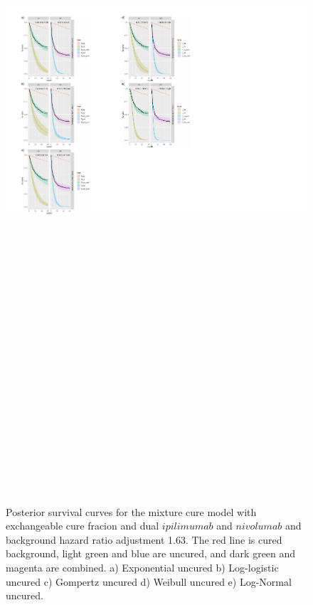 \documentclass[
]{article}
\begin{document}
\begin{figure}

{\centering \includegraphics[width=25cm,height=40cm]{Check_mate_analysis_files/figure-latex/unnamed-chunk-14-1} 

}

\caption{\label{fig:NIVO+IPI_163}Posterior survival curves for the mixture cure model with exchangeable cure fracion and dual $ipilimumab$ and $nivolumab$ and background hazard ratio adjustment 1.63. The red line is cured background, light green and blue are uncured, and dark green and magenta are combined. a) Exponential uncured b) Log-logistic uncured c) Gompertz uncured d) Weibull uncured e) Log-Normal uncured.}\label{fig:unnamed-chunk-14}
\end{figure}
\end{document}
